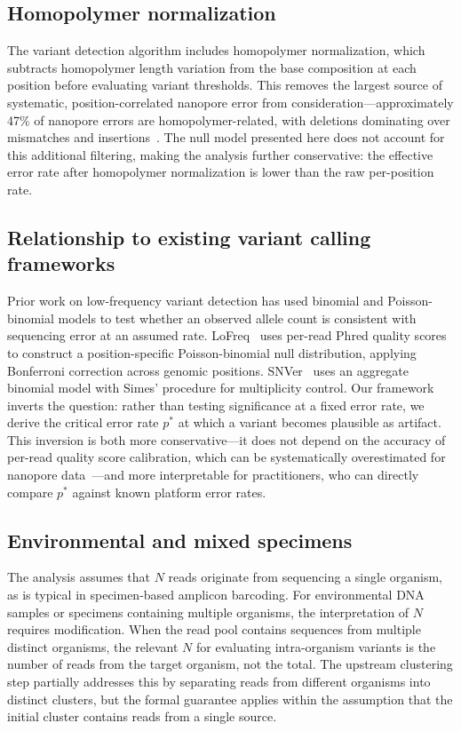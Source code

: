 \documentclass[11pt]{article}
\begin{document}
\subsection{Homopolymer normalization}

The variant detection algorithm includes homopolymer normalization, which
subtracts homopolymer length variation from the base composition at each position
before evaluating variant thresholds. This removes the largest source of
systematic, position-correlated nanopore error from consideration---approximately
47\% of nanopore errors are homopolymer-related, with deletions dominating over
mismatches and insertions~\cite{delahaye2021}. The null model
presented here does not account for this additional filtering, making the analysis
further conservative: the effective error rate after homopolymer normalization is
lower than the raw per-position rate.

\subsection{Relationship to existing variant calling frameworks}

Prior work on low-frequency variant detection has used binomial and
Poisson-binomial models to test whether an observed allele count is consistent
with sequencing error at an assumed rate. LoFreq~\cite{wilm2012} uses per-read
Phred quality scores to construct a position-specific Poisson-binomial null
distribution, applying Bonferroni correction across genomic positions.
SNVer~\cite{wei2011} uses an aggregate binomial model with Simes' procedure for
multiplicity control. Our framework inverts the question: rather than testing
significance at a fixed error rate, we derive the critical error rate $p^*$ at
which a variant becomes plausible as artifact. This inversion is both more
conservative---it does not depend on the accuracy of per-read quality score
calibration, which can be systematically overestimated for nanopore
data~\cite{delahaye2021}---and more interpretable for practitioners, who can
directly compare $p^*$ against known platform error rates.

\subsection{Environmental and mixed specimens}

The analysis assumes that $N$ reads originate from sequencing a single organism,
as is typical in specimen-based amplicon barcoding. For environmental DNA samples
or specimens containing multiple organisms, the interpretation of $N$ requires
modification. When the read pool contains sequences from multiple distinct
organisms, the relevant $N$ for evaluating intra-organism variants is the number
of reads from the target organism, not the total. The upstream clustering step
partially addresses this by separating reads from different organisms into
distinct clusters, but the formal guarantee applies within the assumption that
the initial cluster contains reads from a single source.
\end{document}
